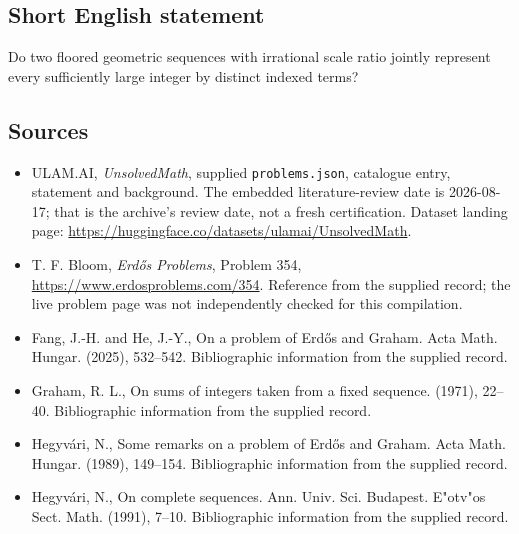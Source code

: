 \documentclass[11pt,a4paper]{article}
\begin{document}
\subsection{Short English statement}

Do two floored geometric sequences with irrational scale ratio jointly represent every sufficiently large integer by distinct indexed terms?

\subsection{Sources}

{\small

\begin{itemize}

\item[\hypertarget{source:statement:1}{S1}] ULAM.AI, \emph{UnsolvedMath}, supplied \texttt{problems.json}, catalogue entry, statement and background. The embedded literature-review date is 2026-08-17; that is the archive’s review date, not a fresh certification. Dataset landing page: \url{https://huggingface.co/datasets/ulamai/UnsolvedMath}.

\item[\hypertarget{source:statement:2}{S2}] T. F. Bloom, \emph{Erdős Problems}, Problem 354, \url{https://www.erdosproblems.com/354}. Reference from the supplied record; the live problem page was not independently checked for this compilation.

\item[\hypertarget{source:statement:3}{S3}] Fang, J.-H. and He, J.-Y., On a problem of {E}rd\H{o}s and {G}raham. Acta Math. Hungar. (2025), 532--542. Bibliographic information from the supplied record.

\item[\hypertarget{source:statement:4}{S4}] Graham, R. L., On sums of integers taken from a fixed sequence. (1971), 22--40. Bibliographic information from the supplied record.

\item[\hypertarget{source:statement:5}{S5}] Hegyv\'ari, N., Some remarks on a problem of {E}rd\H{o}s and {G}raham. Acta Math. Hungar. (1989), 149--154. Bibliographic information from the supplied record.

\item[\hypertarget{source:statement:6}{S6}] Hegyv\'ari, N., On complete sequences. Ann. Univ. Sci. Budapest. E"otv"os Sect. Math. (1991), 7--10. Bibliographic information from the supplied record.

\end{itemize}

}

\label{end:statement}
\end{document}
